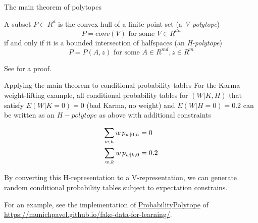 \begin{frame}{The main theorem of polytopes}

  \begin{theorem}
    A subset $P \subset R^d$ is the convex hull of a finite point set (a \emph{V-polytope})
    \begin{equation*}
      P = conv(V) \textrm{ for some }V \in R^{dn}
    \end{equation*}
    if and only if it is a bounded intersection of halfspaces (an \emph{H-polytope})
    \begin{equation*}
      P = P(A,z) \textrm{ for some }A \in R^{md}, z \in R^m
    \end{equation*}
  \end{theorem}

  See \cite{ziegler2012lectures} for a proof.\newline
\end{frame}


\begin{frame}{Applying the main theorem to conditional probability tables}
  For the Karma weight-lifting example, all conditional probability tables for $(W | K, H)$ that satisfy $E(W | K = 0) = 0$ (bad Karma, no weight) and $E(W | H = 0)=0.2$ can be written as an $H-polytope$ as above with additional constraints

  \begin{align*}
    \sum_{w, h} w \, p_{w | 0, h} &= 0\\
    \sum_{w, k} w \, p_{w | k, 0} & = 0.2\newline
  \end{align*}

  By converting this H-representation to a V-representation, we can generate random conditional probability tables subject to expectation constrains.\newline

  For an example, see the implementation of \href{https://munichpavel.github.io/fake-data-docs/html/\_modules/fake\_data\_for\_learning/utils.html\#ProbabilityPolytope}{ProbabilityPolytope} of \href{https://munichpavel.github.io/fake-data-for-learning/}{https://munichpavel.github.io/fake-data-for-learning/}.

\end{frame}

